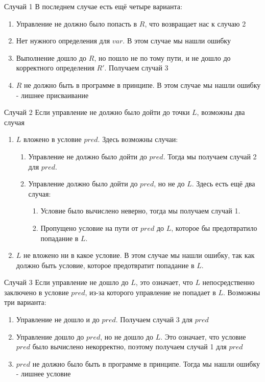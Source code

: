 \documentclass[presentation]{beamer}
\begin{document}
\begin{frame}[label={sec:org6c56435}]{Случай 1}
В последнем случае есть ещё четыре варианта:
\begin{enumerate}
\item Управление не должно было попасть в \(R\), что возвращает нас к случаю 2
\item Нет нужного определения для \(var\). В этом случае мы нашли ошибку
\item Выполнение дошло до \(R\), но пошло не по тому пути, и не дошло до корректного определения \(R'\). Получаем случай 3
\item \(R\) не должно быть в программе в принципе. В этом случае мы нашли ошибку - лишнее присваивание
\end{enumerate}
\end{frame}
\begin{frame}[label={sec:org862a843}]{Случай 2}
Если управление не должно было дойти до точки \(L\), возможны два случая
\begin{enumerate}
\item \(L\) вложено в условие \(pred\). Здесь возможны случаи:
\begin{enumerate}
\item Управление не должно было дойти до \(pred\). Тогда мы получаем случай 2 для \(pred\).
\item Управление должно было дойти до \(pred\), но не до \(L\). Здесь есть ещё два случая:
\begin{enumerate}
\item Условие было вычислено неверно, тогда мы получаем случай 1.
\item Пропущено условие на пути от \(pred\) до \(L\), которое бы предотвратило попадание в \(L\).
\end{enumerate}
\end{enumerate}
\item \(L\) не вложено ни в какое условие. В этом случае мы нашли ошибку, так как должно быть условие, которое предотвратит попадание в \(L\).
\end{enumerate}
\end{frame}
\begin{frame}[label={sec:orge87ff64}]{Случай 3}
Если управление не дошло до \(L\), это означает, что \(L\) непосредственно заключено в условие \(pred\), из-за которого управление не попадает в \(L\).
Возможны три варианта:
\begin{enumerate}
\item Управление не дошло и до \(pred\). Получаем случай 3 для \(pred\)
\item Управление дошло до \(pred\), но не дошло до \(L\). Это означает, что условие \(pred\) было вычислено некорректно, поэтому получаем случай 1 для \(pred\)
\item \(pred\) не должно было быть в программе в принципе. Тогда мы нашли ошибку - лишнее условие
\end{enumerate}
\end{frame}
\end{document}
